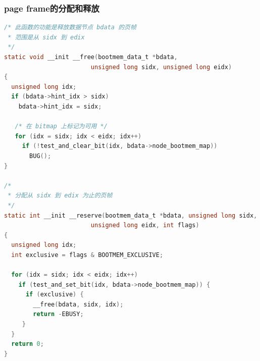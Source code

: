 \documentclass[b5paper,9pt,twoside,openany]{article}
\begin{document}
\subsubsection{page frame的分配和释放}
\begin{lstlisting}[language=C]
/* 此函数的功能是释放数据节点 bdata 的页帧
 * 范围是从 sidx 到 edix
 */
static void __init __free(bootmem_data_t *bdata,
                        unsigned long sidx, unsigned long eidx)
{
  unsigned long idx;
  if (bdata->hint_idx > sidx)
    bdata->hint_idx = sidx;

   /* 在 bitmap 上标记为可用 */
   for (idx = sidx; idx < eidx; idx++)
     if (!test_and_clear_bit(idx, bdata->node_bootmem_map))
       BUG();
}

/*
 * 分配从 sidx 到 edix 为止的页帧
 */
static int __init __reserve(bootmem_data_t *bdata, unsigned long sidx,
                        unsigned long eidx, int flags)
{
  unsigned long idx;
  int exclusive = flags & BOOTMEM_EXCLUSIVE;

  for (idx = sidx; idx < eidx; idx++)
    if (test_and_set_bit(idx, bdata->node_bootmem_map)) {
      if (exclusive) {
        __free(bdata, sidx, idx);
        return -EBUSY;
     }
  }
  return 0;
}

\end{lstlisting}
\end{document}
